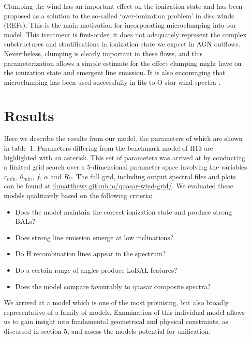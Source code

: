 \documentclass[preprint, a4paper, 11pt]{aastex}
\begin{document}
Clumping the wind has an important effect on the ionization state and has
been proposed as a solution to the so-called `over-ionization problem' in 
disc winds (REFs). This is the main motivation for incorporating microclumping
into our model. This treatment is first-order; it does not adequately
represent the complex substructures and stratifications in ionization
state we expect in AGN outflows. Nevertheless, clumping is clearly
important in these flows, and this parameterization allows a simple estimate
for the effect clumping might have on the ionization state and emergent 
line emission. It is also encouraging that microclumping has been used 
successfully in fits to O-star wind spectra \citep{hillier1991eswingsmodel}.











\section{Results}

Here we describe the results from our model, the parameters
of which are shown in table~1.
Parameters differing from the benchmark model of
H13 are highlighted with an asterisk.
This set of parameters
was arrived at by conducting a limited grid search over a 
5-dimensional parameter space involving the variables
$r_{min}$, $\theta_{min}$, $f$, $\alpha$ and $R_V$.
The full grid, including output spectral files and plots can be found at
\url{jhmatthews.github.io/quasar-wind-grid/}.
We evaluated these models qualitavely based on the following
criteria:
\begin{itemize}
\item Does the model maintain the correct ionization state and produce strong BALs?
\item Does strong line emission emerge at low inclinations?
\item Do H recombination lines appear in the spectrum?
\item Do a certain range of angles produce LoBAL features?
\item Does the model compare favourably to quasar composite spectra?
\end{itemize}
We arrived at a model which is one of the most promising,
but also broadly representative of a family of models. 
Examination of this individual model allows us to gain insight
into fundamental geometrical and physical constraints, 
as discussed in section 5, and assess the models potential
for unification. 
\end{document}
